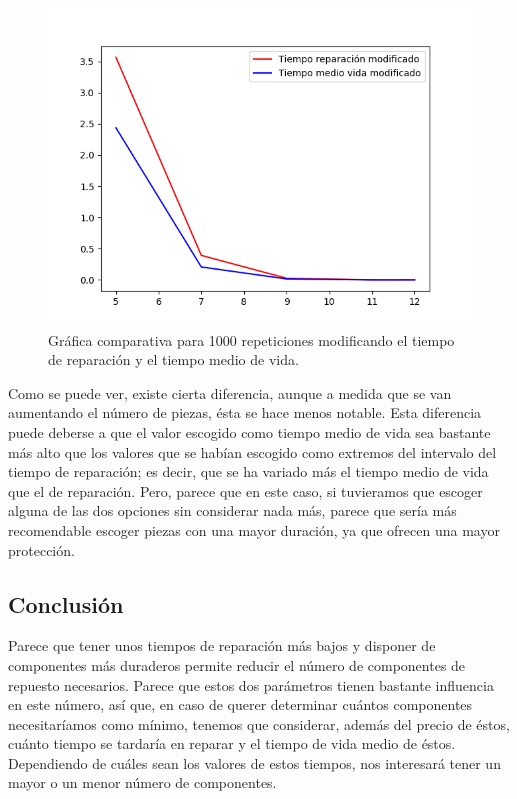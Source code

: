 \documentclass[11pt,a4paper]{report}
\begin{document}
\begin{figure}[H]
\centering
\includegraphics[scale=0.55]{img/radar.png}
\caption{Gráfica comparativa para 1000 repeticiones modificando el tiempo de reparación y el tiempo medio de vida.}
\end{figure}

Como se puede ver, existe cierta diferencia, aunque a medida que se van aumentando el número de piezas, ésta se hace
menos notable. Esta diferencia puede deberse a que el valor escogido como tiempo medio de vida sea bastante más alto que
los valores que se habían escogido como extremos del intervalo del tiempo de reparación; es decir, que se ha variado más
el tiempo medio de vida que el de reparación. Pero, parece que en este caso, si tuvieramos que escoger alguna de las
dos opciones sin considerar nada más, parece que sería más recomendable escoger piezas con una mayor duración, ya que
ofrecen una mayor protección.

\subsection{Conclusión}

Parece que tener unos tiempos de reparación más bajos y disponer de componentes más duraderos permite reducir el número
de componentes de repuesto necesarios. Parece que estos dos parámetros tienen bastante influencia en este número, así que,
en caso de querer determinar cuántos componentes necesitaríamos como mínimo, tenemos que considerar, además del precio de
éstos, cuánto tiempo se tardaría en reparar y el tiempo de vida medio de éstos. Dependiendo de cuáles sean los valores
de estos tiempos, nos interesará tener un mayor o un menor número de componentes.
\end{document}
